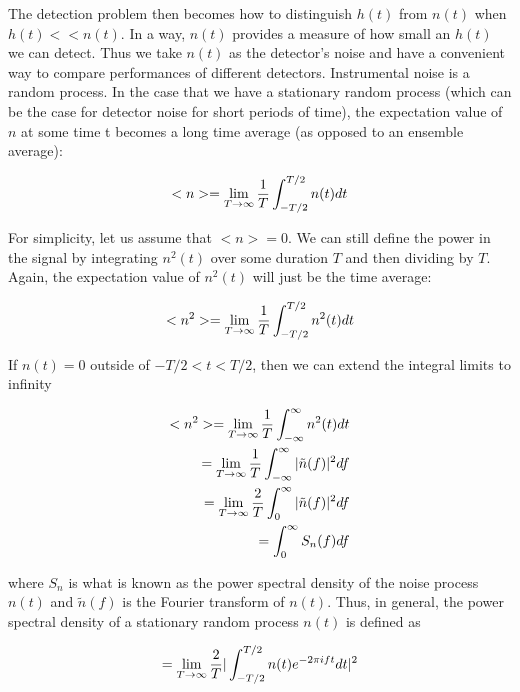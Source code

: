 \documentclass[binding=0.6cm, LaM]{sapthesis}
\begin{document}
	The detection problem then becomes how to distinguish $h(t)$ from $n(t)$ when $h(t) << n(t)$. 
	In a way, $n(t)$ provides a measure of how small an $h(t)$ we can detect. 
	Thus we take $n(t)$ as the detector’s noise and have a convenient way to 
	compare performances of different detectors. 
	Instrumental noise is a random process. In the case that we have a stationary 
	random process (which can be the case for detector noise for short periods of time), 
	the expectation value of $n$ at some time t becomes a long time average (as opposed to an ensemble average):

		\begin{equation}
		<n> = \lim_{T \to \infty} {1 \over T} \int^{T/2}_{-T/2}n(t)dt
		\end{equation}

	For simplicity, let us assume that $<n> = 0$. We can still define the power in the signal by 
	integrating $n^2(t)$ over some duration $T$ and then dividing by $T$. 
	Again, the expectation value of $n^2(t)$ will just be the time average:

		\begin{equation}
		<n^2> = \lim_{T \to \infty} {1 \over T} \int^{T/2}_{-T/2}n^2(t)dt
		\end{equation}

	If $n(t) = 0$ outside of $−T/2 < t < T/2$, then we can extend the integral limits to infinity
	
		\begin{equation}
		\begin{split}
  		<n^2>  = \lim_{T \to \infty}{1 \over T}\int^{\infty}_{-\infty}n^2(t) dt \\
         	       = \lim_{T \to \infty}{1 \over T} \int^{\infty}_{-\infty}|\tilde{n}(f)|^2df \\ 
                       = \lim_{T \to \infty}{2 \over T} \int^{\infty}_{0}|\tilde{n}(f)|^2df \\
                       = \int^{\infty}_{0}S_n(f)df
		\end{split}
		\end{equation}

	where $S_n$ is what is known as the power spectral density of the noise process $n(t)$ 
	and $\tilde{n}(f)$ is the Fourier transform of $n(t)$. 
	Thus, in general, the power spectral density of a stationary random process $n(t)$ is defined as

		\begin{equation}
		= \lim_{T \to \infty}{2 \over T} |\int^{T/2}_{-T/2}n(t)e^{-2\pi ift}dt|^2
		\end{equation}
\end{document}
